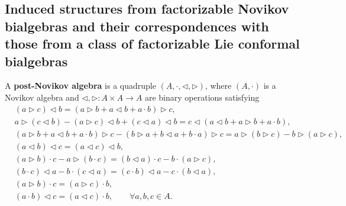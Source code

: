 \documentclass[12pt]{amsart}
\begin{document}
\subsection{Induced structures from factorizable Novikov bialgebras and their correspondences with those from a class of factorizable Lie conformal bialgebras}
    \begin{definition} \cite{YH}
A {\bf post-Novikov algebra} is a quadruple $(A, \cdot,\lhd,\rhd )$, where $(A,\cdot)$ is a Novikov algebra and  $\lhd,\rhd:A\times A\rightarrow A$ are binary operations  satisfying
{\small
\begin{align}
    \label{eq-pn1}  &(a\rhd c)\lhd b=(a\rhd b+a\lhd b+a\cdot b)\rhd c,\\
    \label{eq-pn2}  &a\rhd(c\lhd b)-(a\rhd c)\lhd b+(c\lhd a)\lhd b=c\lhd(a\lhd b+a\rhd b+a\cdot b),\\
    \label{eq-pn3}&(a\rhd b+a\lhd b+a\cdot b)\rhd c-(b\rhd a +b\lhd a+b\cdot a )\rhd c=a\rhd(b\rhd c)-b\rhd(a\rhd c),\\
        \label{eq-pn4}&(a\lhd b)\lhd c=(a\lhd c)\lhd b,\\
            \label{eq-pn5}&(a\rhd b)\cdot c-a\rhd(b\cdot c)=(b\lhd a)\cdot c-b\cdot(a\rhd c),\\
                \label{eq-pn6}&(b\cdot c)\lhd a-b\cdot(c\lhd a)=(c\cdot b)\lhd a -c\cdot(b\lhd a),\\
    \label{eq-pn7}&(a\rhd b)\cdot c=(a\rhd c)\cdot b,\\
    \label{eq-pn8}&(a\cdot b)\lhd c=(a\lhd c)\cdot b,\qquad \forall a,b,c\in A.
\end{align}}
\end{definition}
\end{document}
